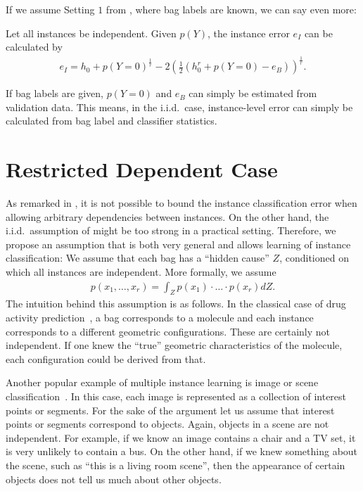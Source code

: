 If we assume Setting $1$ from , where bag labels are known, we can say even more:
\begin{theorem}\label{equality}
Let all instances be independent. Given $p(Y)$, the instance error $e_I$ can be calculated by
\begin{align}
e_I = h_0 + p(Y=0)^\frac{1}{r} - 2 \left (\frac{1}{2} ( h_0^r + p(Y=0) - e_B) \right)^\frac{1}{r}.
\end{align}
\end{theorem}
If bag labels are given, $p(Y=0)$ and $ e_B$ can simply be estimated from validation data.
This means, in the i.i.d.\ case, instance-level error can simply be calculated from bag label and classifier statistics.

\section{Restricted Dependent Case}
As remarked in , it is not possible to bound the instance classification error
when allowing arbitrary dependencies between instances. On the other hand, the i.i.d.\ assumption of 
might be too strong in a practical setting.
Therefore, we propose an assumption that is both very general and allows learning of instance classification:
We assume that each bag has a ``hidden cause'' $Z$, conditioned on which all instances are independent.
More formally, we assume
\begin{align}
    p(x_1,\dotsc,x_r)=\int_Z p(x_1)\cdot \dotsc \cdot p(x_r) dZ.
\end{align}
The intuition behind this assumption is as follows. In the classical case of drug activity prediction~\citep{dietterich1997solving}, a bag corresponds
to a molecule and each instance corresponds to a different geometric configurations. These are certainly not independent.
If one knew the ``true'' geometric characteristics of the molecule, each configuration could be derived from that.

Another popular example of multiple instance learning is image or scene classification~\citep{zhou2007multi,zha2008joint,zhou2009multi}.
In this case, each image
is represented as a collection of interest points or segments.
For the sake of the argument let us assume that interest points or segments correspond to objects.
Again, objects in a scene are not independent. For example, if we know an image contains a chair and a TV set,
it is very unlikely to contain a bus.
On the other hand, if we knew something about the scene, such as ``this is a living room scene'', then the appearance
of certain objects does not tell us much about other objects.

